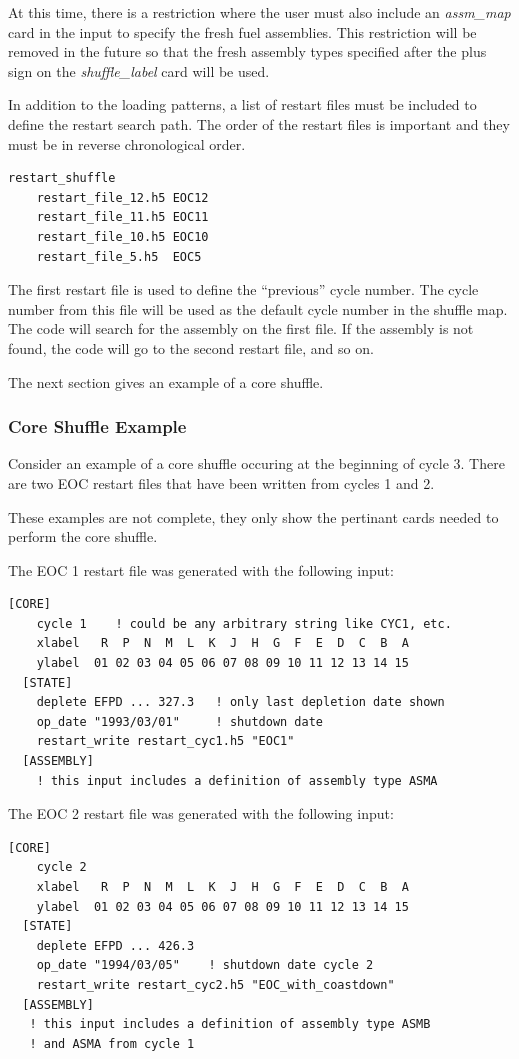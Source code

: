 At this time, there is a restriction where the user must also include an {\it assm\_map} card
in the input to specify the fresh fuel assemblies.  This restriction will be removed in the
future so that the fresh assembly types specified after the plus sign on the {\it shuffle\_label} card will be used.

In addition to the loading patterns, a list of restart files must be included to
define the restart search path.  The order of the restart files is important and they
must be in reverse chronological order.
\begin{Verbatim}[fontsize=\small]
  restart_shuffle
    restart_file_12.h5 EOC12
    restart_file_11.h5 EOC11
    restart_file_10.h5 EOC10
    restart_file_5.h5  EOC5
\end{Verbatim}
The first restart file is used to define the ``previous'' cycle number.  The cycle number
from this file will be used as the default cycle number in the shuffle map.
The code will search for the assembly on the first file. If the assembly is not found,
the code will go to the second restart file, and so on.

The next section gives an example of a core shuffle.

\subsubsection{Core Shuffle Example}

Consider an example of a core shuffle occuring at the beginning of cycle 3.
There are two EOC restart files that have been written from cycles 1 and 2.

These examples are not complete, they only show the pertinant cards needed
to perform the core shuffle.

The EOC 1 restart file was generated with the following input:
\begin{Verbatim}[fontsize=\small]
  [CORE]
    cycle 1    ! could be any arbitrary string like CYC1, etc.
    xlabel   R  P  N  M  L  K  J  H  G  F  E  D  C  B  A
    ylabel  01 02 03 04 05 06 07 08 09 10 11 12 13 14 15
  [STATE]
    deplete EFPD ... 327.3   ! only last depletion date shown
    op_date "1993/03/01"     ! shutdown date
    restart_write restart_cyc1.h5 "EOC1"
  [ASSEMBLY]
    ! this input includes a definition of assembly type ASMA
\end{Verbatim}

The EOC 2 restart file was generated with the following input:
\begin{Verbatim}[fontsize=\small]
  [CORE]
    cycle 2
    xlabel   R  P  N  M  L  K  J  H  G  F  E  D  C  B  A
    ylabel  01 02 03 04 05 06 07 08 09 10 11 12 13 14 15
  [STATE]
    deplete EFPD ... 426.3
    op_date "1994/03/05"    ! shutdown date cycle 2
    restart_write restart_cyc2.h5 "EOC_with_coastdown"
  [ASSEMBLY]
   ! this input includes a definition of assembly type ASMB
   ! and ASMA from cycle 1
\end{Verbatim}

